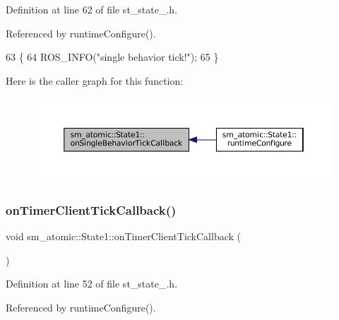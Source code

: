 Definition at line 62 of file st\+\_\+state\+\_.\+h.



Referenced by runtime\+Configure().


\begin{DoxyCode}
63     \{
64         ROS\_INFO(\textcolor{stringliteral}{"single behavior tick!"});
65     \}
\end{DoxyCode}
Here is the caller graph for this function\+:
\nopagebreak
\begin{figure}[H]
\begin{center}
\leavevmode
\includegraphics[width=350pt]{structsm__atomic_1_1State1_a9cb95d91cf5a22f0d9d079dc04bf58aa_icgraph}
\end{center}
\end{figure}
\mbox{\label{structsm__atomic_1_1State1_adea28f0a0fcedb210a29656f53aeee09}} 
\subsubsection{\texorpdfstring{on\+Timer\+Client\+Tick\+Callback()}{onTimerClientTickCallback()}}
{\footnotesize\ttfamily void sm\+\_\+atomic\+::\+State1\+::on\+Timer\+Client\+Tick\+Callback (\begin{DoxyParamCaption}{ }\end{DoxyParamCaption})\hspace{0.3cm}{\ttfamily [inline]}}



Definition at line 52 of file st\+\_\+state\+\_.\+h.



Referenced by runtime\+Configure().


